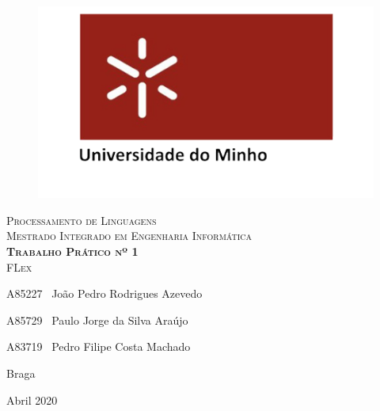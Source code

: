 \documentclass[a4paper,12pt]{report}
\begin{document}


\begin{titlepage}
    \center
    {

    \begin{figure}[t]
        \centering
        \includegraphics[scale=0.4]{images/uminho.png}
        \label{img:logo}
        \vspace{2.0cm}
    \end{figure}

    \vspace{3.0cm}
    \textsc{\Huge Processamento de Linguagens}\\[0.5cm]
    \textsc{\Large{Mestrado Integrado em Engenharia Informática}}\\[0.5cm]
    \vspace{3cm}
    \textsc{\textbf{\Huge{Trabalho Prático nº 1}}}\\[1cm]
    \textsc{\huge{FLex}}\\[1cm]
    \vspace{4cm}
    \begin{flushleft}

        \vspace{1cm}
        \large 
        \vspace{0.5cm}

        \large A85227 \,\,\,João Pedro Rodrigues Azevedo
        \vspace{0.2cm}

        A85729 \,\,\,Paulo Jorge da Silva Araújo
        \vspace{0.2cm}

        A83719 \,\,\,Pedro Filipe Costa Machado
        \vspace{0.2cm}

    \end{flushleft}
    \begin{flushright}
        Braga

        Abril 2020
    \end{flushright}

\date{\today}
}
\end{titlepage}
\end{document}
